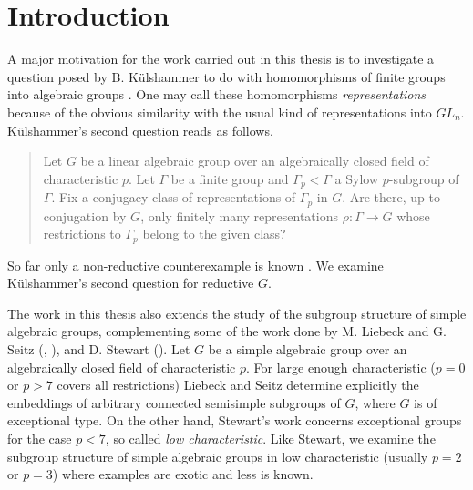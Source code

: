 
\chapter{Introduction}
\label{Chapter1}

A major motivation for the work carried out in this thesis is to investigate a question posed by B. K\"ulshammer to do with homomorphisms of finite groups into algebraic groups \cite{slodowy1997two}. One may call these homomorphisms \emph{representations} because of the obvious similarity with the usual kind of representations into $GL_n$. K\"ulshammer's second question reads as follows.
\begin{quote}
  Let $G$ be a linear algebraic group over an algebraically closed field of characteristic $p$. Let $\Gamma$ be a finite group and $\Gamma_p < \Gamma$ a Sylow $p$-subgroup of $\Gamma$. Fix a conjugacy class of representations of $\Gamma_p$ in $G$. Are there, up to conjugation by $G$, only finitely many representations $\rho:\Gamma\rightarrow G$ whose restrictions to $\Gamma_p$ belong to the given class?
\end{quote}

So far only a non-reductive counterexample is known \cite[Appendix]{slodowy1997two}. We examine K\"ulshammer's second question for reductive $G$. 


The work in this thesis also extends the study of the subgroup structure of simple algebraic groups, complementing some of the work done by M. Liebeck and G. Seitz (\cite{liebeck1996reductive}, \cite{liebeck2004maximal}), and D. Stewart (\cite{stewart2010g}).
Let $G$ be a simple algebraic group over an algebraically closed field of characteristic $p$. For large enough characteristic ($p=0$ or $p>7$ covers all restrictions) Liebeck and Seitz determine explicitly the embeddings of arbitrary connected semisimple subgroups of $G$, where $G$ is of exceptional type.
On the other hand, Stewart's work concerns exceptional groups for the case $p<7$, so called \emph{low characteristic}.
Like Stewart, we examine the subgroup structure of simple algebraic groups in low characteristic (usually $p=2$ or $p=3$) where examples are exotic and less is known. 

